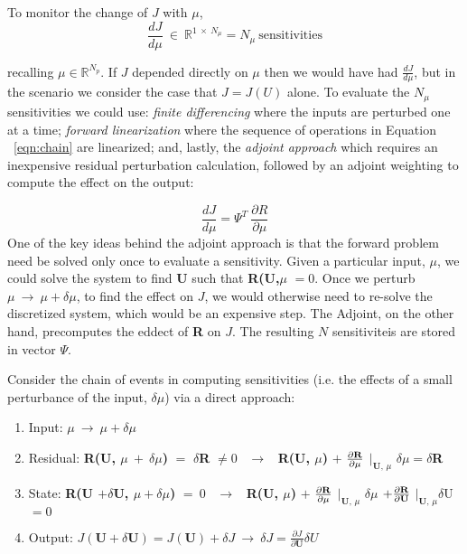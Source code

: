 To monitor the change of $J$ with $\mu$,
\begin{equation}
\frac{dJ}{d\mu} ~\in~ \mathbb{R}^{1~\times~N_{\mu}} = N_\mu ~ \text{sensitivities}
\end{equation}

recalling $\mu \in \mathbb{R}^{N_p}$. If $J$ depended directly on $\mu$ then we would have had $\frac{dJ}{d\mu}$, but in the scenario we consider the case that $J = J(U)$ alone. To evaluate the $N_\mu$ sensitivities we could use: \textit{finite differencing} where the inputs are  perturbed one at a time;  \textit{forward linearization} where the sequence of operations in Equation ~\eqref{eqn:chain} are linearized; and, lastly, the \textit{adjoint approach} which requires an inexpensive residual perturbation calculation, followed by an adjoint weighting to compute the effect on the output:\par
\begin{equation}
\frac{dJ}{d\mu} = \Psi^T ~\frac{\partial R}{\partial \mu}
\end{equation}
One of the key ideas behind the adjoint approach is that the forward problem need be solved only once to evaluate a sensitivity. Given a particular input, $\mu$, we could solve the system to find \textbf{U} such that \textbf{R(U,$\mu$} $ = 0$. Once we perturb $\mu ~\to~ \mu + \delta \mu$, to find the effect on $J$, we would otherwise need to re-solve the discretized system, which would be an expensive step. The Adjoint, on the other hand, precomputes the eddect of \textbf{R} on $J$. The resulting $N$ sensitiviteis are stored in vector $\Psi$.\par

Consider the chain of events in computing sensitivities (i.e. the effects of a small perturbance of the input, $\delta \mu$) via a direct approach:
\begin{enumerate}
\item Input:  $\mu ~\to~ \mu + \delta \mu$
\item Residual: \textbf{R(U, $\mu ~+~ \delta \mu$)} $=$ $\delta$\textbf{R} $\neq 0$ ~$\to$~ \textbf{R(U, $\mu$)} $+$ $\frac{\partial \text{\textbf{R}}}{\partial \mu}$ $\bigg|_{\textbf{U, $\mu$}}$ $\delta \mu = \delta$\textbf{R}
\item State: \textbf{R(U $+ \delta$U, $ \mu + \delta\mu$)} $= ~0$ ~$\to$~ \textbf{R(U, $\mu$)} $+$ $\frac{\partial \text{\textbf{R}}}{\partial \mu}$ $\bigg|_{\textbf{U, $\mu$}}$ $\delta \mu$ $ + \frac{\partial \text{\textbf{R}}}{\partial \text{\textbf{U}}}$     $\bigg|_{\textbf{U, $\mu$}} \delta$U  $ = 0$
\item Output: $J(\textbf{U} + \delta \textbf{U}) = J(\textbf{U}) + \delta J ~\to~ \delta J = \frac{\partial J}{\partial \textbf{U}} \delta U $
\end{enumerate}

